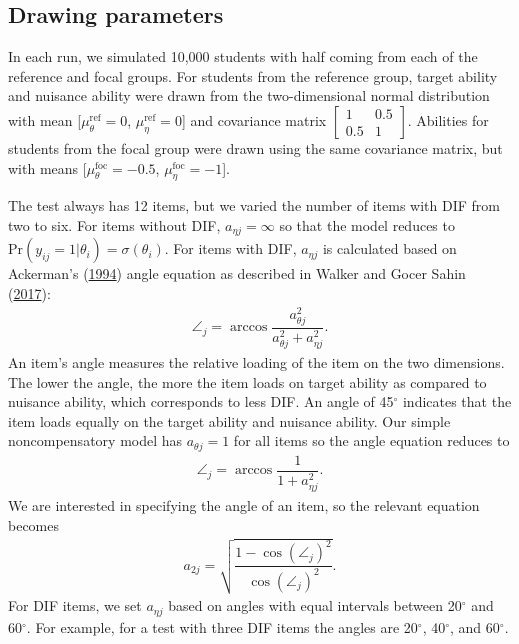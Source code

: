 \documentclass[
  11pt,
]{article}
\begin{document}
\hypertarget{drawing-parameters}{%
\subsection{Drawing parameters}\label{drawing-parameters}}

In each run, we simulated 10,000 students with half coming from each of the reference and focal groups. For students from the reference group, target ability and nuisance ability were drawn from the two-dimensional normal distribution with mean {[}\(\mu_\theta^\text{ref} = 0\), \(\mu_\eta^\text{ref} = 0\){]} and covariance matrix \(\begin{bmatrix} 1 & 0.5 \\ 0.5 & 1 \end{bmatrix}\). Abilities for students from the focal group were drawn using the same covariance matrix, but with means {[}\(\mu_\theta^\text{foc} = -0.5\), \(\mu_\eta^\text{foc} = -1\){]}.

The test always has 12 items, but we varied the number of items with DIF from two to six. For items without DIF, \(a_{\eta j} = \infty\) so that the model reduces to \(\text{Pr}(y_{ij} = 1 | \theta_i) = \sigma(\theta_i)\). For items with DIF, \(a_{\eta j}\) is calculated based on Ackerman's (\protect\hyperlink{ref-ackerman1994using}{1994}) angle equation as described in Walker and Gocer Sahin (\protect\hyperlink{ref-walker2017using}{2017}):
\begin{align}
\angle_j = \arccos \dfrac{a_{\theta j}^2}{a_{\theta j}^2 + a_{\eta j}^2}.
\end{align}
An item's angle measures the relative loading of the item on the two dimensions. The lower the angle, the more the item loads on target ability as compared to nuisance ability, which corresponds to less DIF. An angle of 45\(^\circ\) indicates that the item loads equally on the target ability and nuisance ability. Our simple noncompensatory model has \(a_{\theta j} = 1\) for all items so the angle equation reduces to
\begin{align}
\angle_j = \arccos \dfrac{1}{1 + a_{\eta j}^2}.
\end{align}
We are interested in specifying the angle of an item, so the relevant equation becomes
\begin{align}
a_{2j} = \sqrt{\dfrac{1 - \cos(\angle_j)^2}{\cos(\angle_j)^2}}.
\end{align}
For DIF items, we set \(a_{\eta j}\) based on angles with equal intervals between 20\(^\circ\) and 60\(^\circ\). For example, for a test with three DIF items the angles are 20\(^\circ\), 40\(^\circ\), and 60\(^\circ\).
\end{document}

